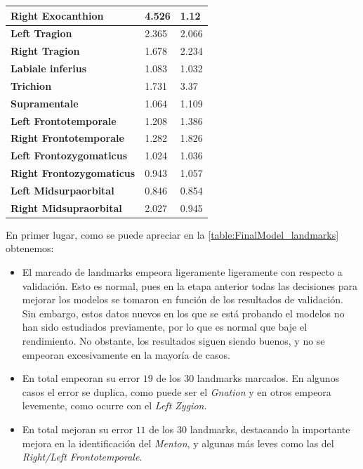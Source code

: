 \begin{table}[!ht]
\begin{tabular}{|l|l|l|}
                \textbf{Right Exocanthion} & 4.526 & \cellcolor{green!25}1.12 \\ \hline
                \textbf{Left Tragion} & 2.365 & \cellcolor{green!25}2.066 \\ \hline
                \textbf{Right Tragion} & \cellcolor{green!25}1.678 & 2.234 \\ \hline
                \textbf{Labiale inferius} & 1.083 & \cellcolor{green!25}1.032 \\ \hline
                \textbf{Trichion} & \cellcolor{green!25}1.731 & 3.37 \\ \hline
                \textbf{Supramentale} & \cellcolor{green!25}1.064 & 1.109 \\ \hline
                \textbf{Left Frontotemporale} & \cellcolor{green!25}1.208 & 1.386 \\ \hline
                \textbf{Right Frontotemporale} & \cellcolor{green!25}1.282 & 1.826 \\ \hline
                \textbf{Left Frontozygomaticus} & \cellcolor{green!25}1.024 & 1.036 \\ \hline
                \textbf{Right Frontozygomaticus} & \cellcolor{green!25}0.943 & 1.057 \\ \hline
                \textbf{Left Midsurpaorbital} & \cellcolor{green!25}0.846 & 0.854 \\ \hline
                \textbf{Right Midsupraorbital} & 2.027 & \cellcolor{green!25}0.945 \\ \hline
            \end{tabular}
            \label{table:FinalModel_landmarks}
        \end{table}
        
        \medskip

        \noindent En primer lugar, como se puede apreciar en la \autoref{table:FinalModel_landmarks} obtenemos: 

        \begin{itemize}
            \item El marcado de landmarks empeora ligeramente ligeramente con respecto a validación. Esto es normal, pues en la etapa anterior todas las decisiones para mejorar los modelos se tomaron en función de los resultados de validación. Sin embargo, estos datos nuevos en los que se está probando el modelos no han sido estudiados previamente, por lo que es normal que baje el rendimiento. No obstante, los resultados siguen siendo buenos, y no se empeoran excesivamente en la mayoría de casos. 
            \item En total empeoran su error $19$ de los $30$ landmarks marcados. En algunos casos el error se duplica, como puede ser el \textit{Gnation} y en otros empeora levemente, como ocurre con el \textit{Left Zygion}. 
            \item En total mejoran su error $11$ de los $30$ landmarks, destacando la importante mejora en la identificación del \textit{Menton}, y algunas más leves como las del \textit{Right/Left Frontotemporale}.
        \end{itemize}


